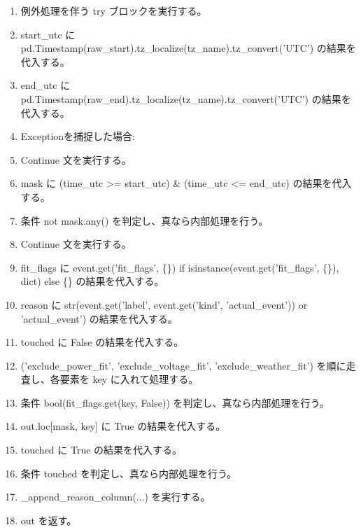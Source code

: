 \documentclass[a4paper,11pt]{article}
\begin{document}
\begin{enumerate}[leftmargin=1.8em]
\item   例外処理を伴う try ブロックを実行する。
\item     start\_utc に pd.Timestamp(raw\_start).tz\_localize(tz\_name).tz\_convert('UTC') の結果を代入する。
\item     end\_utc に pd.Timestamp(raw\_end).tz\_localize(tz\_name).tz\_convert('UTC') の結果を代入する。
\item     Exceptionを捕捉した場合:
\item     Continue 文を実行する。
\item   mask に (time\_utc >= start\_utc) \& (time\_utc <= end\_utc) の結果を代入する。
\item   条件 not mask.any() を判定し、真なら内部処理を行う。
\item     Continue 文を実行する。
\item   fit\_flags に event.get('fit\_flags', \{\}) if isinstance(event.get('fit\_flags', \{\}), dict) else \{\} の結果を代入する。
\item   reason に str(event.get('label', event.get('kind', 'actual\_event')) or 'actual\_event') の結果を代入する。
\item   touched に False の結果を代入する。
\item   ('exclude\_power\_fit', 'exclude\_voltage\_fit', 'exclude\_weather\_fit') を順に走査し、各要素を key に入れて処理する。
\item     条件 bool(fit\_flags.get(key, False)) を判定し、真なら内部処理を行う。
\item       out.loc[mask, key] に True の結果を代入する。
\item       touched に True の結果を代入する。
\item   条件 touched を判定し、真なら内部処理を行う。
\item     \_append\_reason\_column(...) を実行する。
\item out を返す。
            \end{enumerate}
\end{document}
